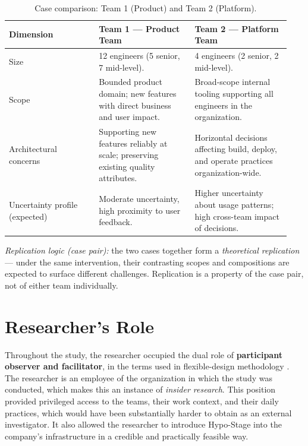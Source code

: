 \begin{table}[htbp]
\centering
\caption{Case comparison: Team 1 (Product) and Team 2 (Platform).}
\label{tab:case-comparison}
\begin{tabular}{p{0.30\linewidth} p{0.32\linewidth} p{0.32\linewidth}}
\toprule
\textbf{Dimension} & \textbf{Team 1 --- Product Team} & \textbf{Team 2 --- Platform Team} \\
\midrule
Size & 12 engineers (5 senior, 7 mid-level). & 4 engineers (2 senior, 2 mid-level). \\
\midrule
Scope & Bounded product domain; new features with direct business and user impact. & Broad-scope internal tooling supporting all engineers in the organization. \\
\midrule
Architectural concerns & Supporting new features reliably at scale; preserving existing quality attributes. & Horizontal decisions affecting build, deploy, and operate practices organization-wide. \\
\midrule
Uncertainty profile (expected) & Moderate uncertainty, high proximity to user feedback. & Higher uncertainty about usage patterns; high cross-team impact of decisions. \\
\bottomrule
\end{tabular}

\vspace{0.5em}
{\footnotesize\emph{Replication logic (case pair):} the two cases together form a
\emph{theoretical replication} --- under the same intervention, their contrasting
scopes and compositions are expected to surface different challenges. Replication is
a property of the case pair, not of either team individually.\par}
\end{table}

\section{Researcher's Role}
\label{sec:researcher-role}

Throughout the study, the researcher occupied the dual role of
\textbf{participant observer and facilitator}, in the terms used in flexible-design methodology \citep{robson2016}.
The researcher is an employee of the organization in which the study was conducted, which makes this an instance of \emph{insider research}.
This position provided privileged access to the teams, their work context, and their daily practices, which would have been substantially harder to
obtain as an external investigator. It also allowed the researcher to introduce
Hypo-Stage into the company's infrastructure in a credible and practically feasible
way.

